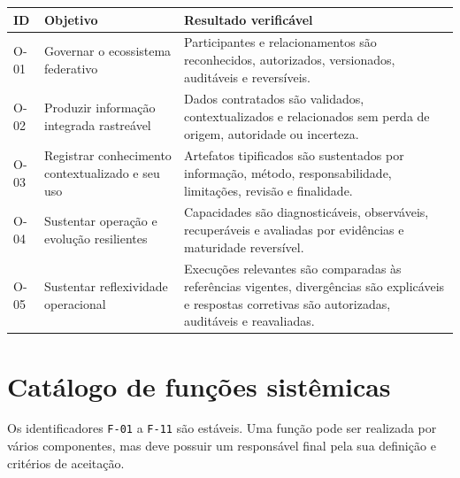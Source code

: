 \documentclass[11pt,a4paper,oneside]{article}
\begin{document}
\begin{longtable}{P{1.5cm}P{5.1cm}P{8.2cm}}
\toprule
\textbf{ID} & \textbf{Objetivo} & \textbf{Resultado verificável} \\
\midrule
\endhead
O-01 & Governar o ecossistema federativo & Participantes e relacionamentos são reconhecidos, autorizados, versionados, auditáveis e reversíveis. \\
O-02 & Produzir informação integrada rastreável & Dados contratados são validados, contextualizados e relacionados sem perda de origem, autoridade ou incerteza. \\
O-03 & Registrar conhecimento contextualizado e seu uso & Artefatos tipificados são sustentados por informação, método, responsabilidade, limitações, revisão e finalidade. \\
O-04 & Sustentar operação e evolução resilientes & Capacidades são diagnosticáveis, observáveis, recuperáveis e avaliadas por evidências e maturidade reversível. \\
O-05 & Sustentar reflexividade operacional & Execuções relevantes são comparadas às referências vigentes, divergências são explicáveis e respostas corretivas são autorizadas, auditáveis e reavaliadas. \\
\bottomrule
\end{longtable}

\section{Catálogo de funções sistêmicas}

Os identificadores \texttt{F-01} a \texttt{F-11} são estáveis. Uma função pode ser realizada por vários componentes, mas deve possuir um responsável final pela sua definição e critérios de aceitação.
\end{document}
